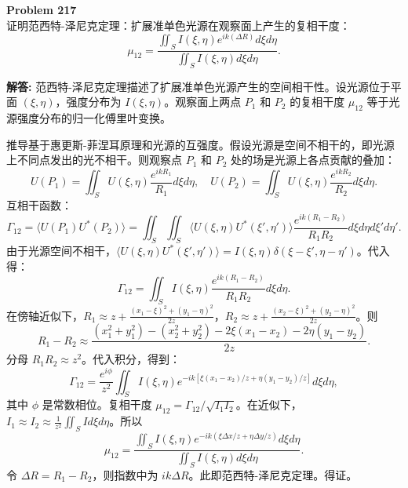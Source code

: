 \documentclass[12pt, a4paper, oneside]{ctexart}
\newenvironment{solution}{\par\noindent\textbf{解答:}\quad}{\par}
\begin{document}
\begin{mdframed}[backgroundcolor=gray!10, linewidth=0pt]
    \textbf{Problem 217} \\
    证明范西特-泽尼克定理：扩展准单色光源在观察面上产生的复相干度：
    \[
    \mu_{12} = \frac{\iint_S I(\xi,\eta) e^{i k (\Delta R)} d\xi d\eta}{\iint_S I(\xi,\eta) d\xi d\eta}.
    \]
\end{mdframed}
\begin{solution}
    范西特-泽尼克定理描述了扩展准单色光源产生的空间相干性。设光源位于平面 $(\xi, \eta)$，强度分布为 $I(\xi, \eta)$。观察面上两点 $P_1$ 和 $P_2$ 的复相干度 $\mu_{12}$ 等于光源强度分布的归一化傅里叶变换。

    推导基于惠更斯-菲涅耳原理和光源的互强度。假设光源是空间不相干的，即光源上不同点发出的光不相干。则观察点 $P_1$ 和 $P_2$ 处的场是光源上各点贡献的叠加：
    \[
    U(P_1) = \iint_S U(\xi,\eta) \frac{e^{i k R_1}}{R_1} d\xi d\eta, \quad U(P_2) = \iint_S U(\xi,\eta) \frac{e^{i k R_2}}{R_2} d\xi d\eta.
    \]
    互相干函数：
    \[
    \Gamma_{12} = \langle U(P_1) U^*(P_2) \rangle = \iint_S \iint_S \langle U(\xi,\eta) U^*(\xi',\eta') \rangle \frac{e^{i k (R_1 - R_2)}}{R_1 R_2} d\xi d\eta d\xi' d\eta'.
    \]
    由于光源空间不相干，$\langle U(\xi,\eta) U^*(\xi',\eta') \rangle = I(\xi,\eta) \delta(\xi-\xi', \eta-\eta')$。代入得：
    \[
    \Gamma_{12} = \iint_S I(\xi,\eta) \frac{e^{i k (R_1 - R_2)}}{R_1 R_2} d\xi d\eta.
    \]
    在傍轴近似下，$R_1 \approx z + \frac{(x_1-\xi)^2+(y_1-\eta)^2}{2z}$，$R_2 \approx z + \frac{(x_2-\xi)^2+(y_2-\eta)^2}{2z}$。则
    \[
    R_1 - R_2 \approx \frac{(x_1^2+y_1^2) - (x_2^2+y_2^2) - 2\xi(x_1-x_2) - 2\eta(y_1-y_2)}{2z}.
    \]
    分母 $R_1 R_2 \approx z^2$。代入积分，得到：
    \[
    \Gamma_{12} = \frac{e^{i \phi}}{z^2} \iint_S I(\xi,\eta) e^{-i k [\xi (x_1-x_2)/z + \eta (y_1-y_2)/z]} d\xi d\eta,
    \]
    其中 $\phi$ 是常数相位。复相干度 $\mu_{12} = \Gamma_{12}/\sqrt{I_1 I_2}$。在近似下，$I_1 \approx I_2 \approx \frac{1}{z^2} \iint_S I d\xi d\eta$。所以
    \[
    \mu_{12} = \frac{\iint_S I(\xi,\eta) e^{-i k (\xi \Delta x/z + \eta \Delta y/z)} d\xi d\eta}{\iint_S I(\xi,\eta) d\xi d\eta}.
    \]
    令 $\Delta R = R_1 - R_2$，则指数中为 $i k \Delta R$。此即范西特-泽尼克定理。得证。
\end{solution}
\end{document}
